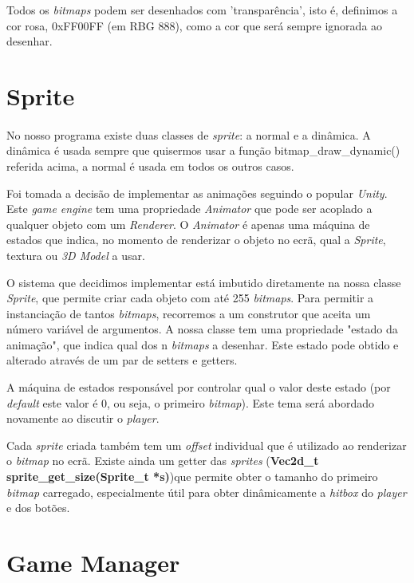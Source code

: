 \documentclass{report}
\begin{document}
Todos os \textit{bitmaps} podem ser desenhados com 'transparência', isto é, definimos a cor rosa, 0xFF00FF (em RBG 888), como a cor que será sempre ignorada ao desenhar.

\section{Sprite}

\paragraph{}
No nosso programa existe duas classes de \textit{sprite}: a normal e a dinâmica. A dinâmica é usada sempre que quisermos usar a função bitmap\_draw\_dynamic() referida acima, a normal é usada em todos os outros casos.

Foi tomada a decisão de implementar as animações seguindo o popular \textit{Unity}. Este \textit{game engine} tem uma propriedade \textit{Animator} que pode ser acoplado a qualquer objeto com um \textit{Renderer}. O \textit{Animator} é apenas uma máquina de estados que indica, no momento de renderizar o objeto no ecrã, qual a \textit{Sprite}, textura ou \textit{3D Model} a usar.

O sistema que decidimos implementar está imbutido diretamente na nossa classe \textit{Sprite}, que permite criar cada objeto com até 255 \textit{bitmaps}. Para permitir a instanciação de tantos \textit{bitmaps}, recorremos a um construtor que aceita um número variável de argumentos. A nossa classe tem uma propriedade "estado da animação", que indica qual dos n \textit{bitmaps} a desenhar. Este estado pode obtido e alterado através de um par de setters e getters.

A máquina de estados responsável por controlar qual o valor deste estado (por \textit{default} este valor é 0, ou seja, o primeiro \textit{bitmap}). Este tema será abordado novamente ao discutir o \textit{player}.

Cada \textit{sprite} criada também tem um \textit{offset} individual que é utilizado ao renderizar o \textit{bitmap} no ecrã. Existe ainda um getter das \textit{sprites} (\textbf{Vec2d\_t sprite\_get\_size(Sprite\_t *s)})que permite obter o tamanho do primeiro \textit{bitmap} carregado, especialmente útil para obter dinâmicamente a \textit{hitbox} do \textit{player} e dos botões. 

\section{Game Manager}
\end{document}
